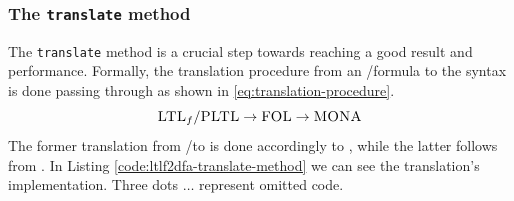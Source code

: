 \subsubsection{The \texttt{translate} method}
The \texttt{translate} method is a crucial step towards reaching a good result and performance. Formally, the translation procedure from an \LTLf/\PLTL formula to the \MONA syntax is done passing through \FOL as shown in \ref{eq:translation-procedure}.
\begin{equation}\label{eq:translation-procedure}
\textsc{LTL}_f/\textsc{PLTL} \rightarrow \textsc{FOL} \rightarrow \textsc{MONA}
\end{equation}
The former translation from \LTLf/\PLTL to \FOL is done accordingly to \citep{de2013linear}, while the latter follows from \citep{monamanual2001}.
In Listing \ref{code:ltlf2dfa-translate-method} we can see the translation's implementation. Three dots $\dots$ represent omitted code.
